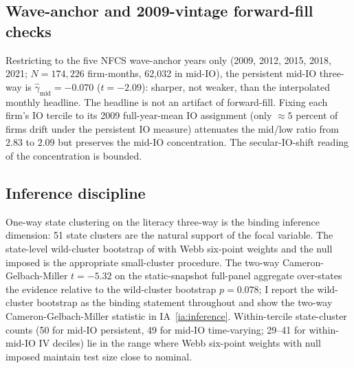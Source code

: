 \subsection{Wave-anchor and 2009-vintage forward-fill checks}
\label{sec:robust-vintage}

Restricting to the five NFCS wave-anchor years only (2009, 2012, 2015, 2018, 2021; $N = 174{,}226$ firm-months, 62{,}032 in mid-IO), the persistent mid-IO three-way is $\hat\gamma_{\text{mid}} = -0.070$ ($t = -2.09$): sharper, not weaker, than the interpolated monthly headline. The headline is not an artifact of forward-fill. Fixing each firm's IO tercile to its 2009 full-year-mean IO assignment (only $\approx 5$ percent of firms drift under the persistent IO measure) attenuates the mid/low ratio from $2.83$ to $2.09$ but preserves the mid-IO concentration. The secular-IO-shift reading of the concentration is bounded.

\subsection{Inference discipline}
\label{sec:robust-inference}

One-way state clustering on the literacy three-way is the binding inference dimension: 51 state clusters are the natural support of the focal variable. The state-level wild-cluster bootstrap of \citet{cameronGelbachMiller2008} with Webb six-point weights \citep{webb2014} and the null imposed is the appropriate small-cluster procedure. The two-way Cameron-Gelbach-Miller \citep{cameronGelbachMiller2011} $t = -5.32$ on the static-snapshot full-panel aggregate over-states the evidence relative to the wild-cluster bootstrap $p = 0.078$; I report the wild-cluster bootstrap as the binding statement throughout and show the two-way Cameron-Gelbach-Miller statistic in IA~\ref{ia:inference}. Within-tercile state-cluster counts (50 for mid-IO persistent, 49 for mid-IO time-varying; 29--41 for within-mid-IO IV deciles) lie in the range where Webb six-point weights with null imposed maintain test size close to nominal.
